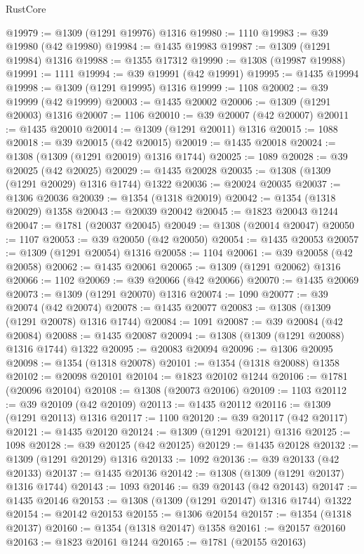\begin{lexlean}{RustCore}
\begin{coremodule}
@19979 := @1309 (@1291 @19976) @1316
@19980 := 1110
@19983 := @39 @19980 (@42 @19980)
@19984 := @1435 @19983
@19987 := @1309 (@1291 @19984) @1316
@19988 := @1355 @17312
@19990 := @1308 (@19987 @19988)
@19991 := 1111
@19994 := @39 @19991 (@42 @19991)
@19995 := @1435 @19994
@19998 := @1309 (@1291 @19995) @1316
@19999 := 1108
@20002 := @39 @19999 (@42 @19999)
@20003 := @1435 @20002
@20006 := @1309 (@1291 @20003) @1316
@20007 := 1106
@20010 := @39 @20007 (@42 @20007)
@20011 := @1435 @20010
@20014 := @1309 (@1291 @20011) @1316
@20015 := 1088
@20018 := @39 @20015 (@42 @20015)
@20019 := @1435 @20018
@20024 := @1308 (@1309 (@1291 @20019) @1316 @1744)
@20025 := 1089
@20028 := @39 @20025 (@42 @20025)
@20029 := @1435 @20028
@20035 := @1308 (@1309 (@1291 @20029) @1316 @1744) @1322
@20036 := @20024 @20035
@20037 := @1306 @20036
@20039 := @1354 (@1318 @20019)
@20042 := @1354 (@1318 @20029) @1358
@20043 := @20039 @20042
@20045 := @1823 @20043 @1244
@20047 := @1781 (@20037 @20045)
@20049 := @1308 (@20014 @20047)
@20050 := 1107
@20053 := @39 @20050 (@42 @20050)
@20054 := @1435 @20053
@20057 := @1309 (@1291 @20054) @1316
@20058 := 1104
@20061 := @39 @20058 (@42 @20058)
@20062 := @1435 @20061
@20065 := @1309 (@1291 @20062) @1316
@20066 := 1102
@20069 := @39 @20066 (@42 @20066)
@20070 := @1435 @20069
@20073 := @1309 (@1291 @20070) @1316
@20074 := 1090
@20077 := @39 @20074 (@42 @20074)
@20078 := @1435 @20077
@20083 := @1308 (@1309 (@1291 @20078) @1316 @1744)
@20084 := 1091
@20087 := @39 @20084 (@42 @20084)
@20088 := @1435 @20087
@20094 := @1308 (@1309 (@1291 @20088) @1316 @1744) @1322
@20095 := @20083 @20094
@20096 := @1306 @20095
@20098 := @1354 (@1318 @20078)
@20101 := @1354 (@1318 @20088) @1358
@20102 := @20098 @20101
@20104 := @1823 @20102 @1244
@20106 := @1781 (@20096 @20104)
@20108 := @1308 (@20073 @20106)
@20109 := 1103
@20112 := @39 @20109 (@42 @20109)
@20113 := @1435 @20112
@20116 := @1309 (@1291 @20113) @1316
@20117 := 1100
@20120 := @39 @20117 (@42 @20117)
@20121 := @1435 @20120
@20124 := @1309 (@1291 @20121) @1316
@20125 := 1098
@20128 := @39 @20125 (@42 @20125)
@20129 := @1435 @20128
@20132 := @1309 (@1291 @20129) @1316
@20133 := 1092
@20136 := @39 @20133 (@42 @20133)
@20137 := @1435 @20136
@20142 := @1308 (@1309 (@1291 @20137) @1316 @1744)
@20143 := 1093
@20146 := @39 @20143 (@42 @20143)
@20147 := @1435 @20146
@20153 := @1308 (@1309 (@1291 @20147) @1316 @1744) @1322
@20154 := @20142 @20153
@20155 := @1306 @20154
@20157 := @1354 (@1318 @20137)
@20160 := @1354 (@1318 @20147) @1358
@20161 := @20157 @20160
@20163 := @1823 @20161 @1244
@20165 := @1781 (@20155 @20163)

\end{coremodule}
\end{lexlean}

